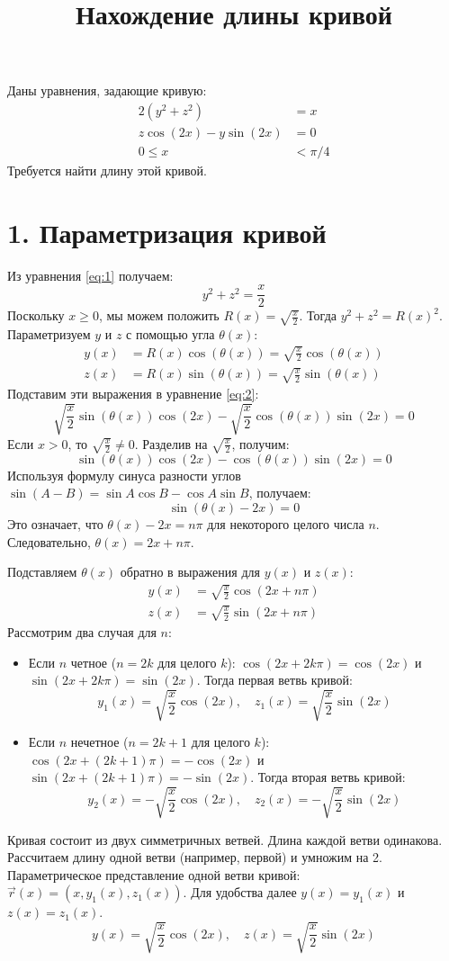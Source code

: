 \documentclass{article}
\title{Нахождение длины кривой}
\date{}
\begin{document}
\maketitle

Даны уравнения, задающие кривую:
\begin{align}
    2(y^2 + z^2) &= x \label{eq:1} \\
    z \cos(2x) - y \sin(2x) &= 0 \label{eq:2} \\
    0 \le x &< \pi/4 \label{eq:3}
\end{align}
Требуется найти длину этой кривой.

\section*{1. Параметризация кривой}
Из уравнения \eqref{eq:1} получаем:
\[ y^2 + z^2 = \frac{x}{2} \]
Поскольку $x \ge 0$, мы можем положить $R(x) = \sqrt{\frac{x}{2}}$. Тогда $y^2 + z^2 = R(x)^2$.
Параметризуем $y$ и $z$ с помощью угла $\theta(x)$:
\begin{align*}
    y(x) &= R(x) \cos(\theta(x)) = \sqrt{\frac{x}{2}} \cos(\theta(x)) \\
    z(x) &= R(x) \sin(\theta(x)) = \sqrt{\frac{x}{2}} \sin(\theta(x))
\end{align*}
Подставим эти выражения в уравнение \eqref{eq:2}:
\[ \sqrt{\frac{x}{2}} \sin(\theta(x)) \cos(2x) - \sqrt{\frac{x}{2}} \cos(\theta(x)) \sin(2x) = 0 \]
Если $x > 0$, то $\sqrt{\frac{x}{2}} \neq 0$. Разделив на $\sqrt{\frac{x}{2}}$, получим:
\[ \sin(\theta(x)) \cos(2x) - \cos(\theta(x)) \sin(2x) = 0 \]
Используя формулу синуса разности углов $\sin(A-B) = \sin A \cos B - \cos A \sin B$, получаем:
\[ \sin(\theta(x) - 2x) = 0 \]
Это означает, что $\theta(x) - 2x = n\pi$ для некоторого целого числа $n$.
Следовательно, $\theta(x) = 2x + n\pi$.

Подставляем $\theta(x)$ обратно в выражения для $y(x)$ и $z(x)$:
\begin{align*}
    y(x) &= \sqrt{\frac{x}{2}} \cos(2x + n\pi) \\
    z(x) &= \sqrt{\frac{x}{2}} \sin(2x + n\pi)
\end{align*}
Рассмотрим два случая для $n$:
\begin{itemize}
    \item Если $n$ четное ($n = 2k$ для целого $k$):
    $\cos(2x + 2k\pi) = \cos(2x)$ и $\sin(2x + 2k\pi) = \sin(2x)$.
    Тогда первая ветвь кривой:
    \[ y_1(x) = \sqrt{\frac{x}{2}} \cos(2x), \quad z_1(x) = \sqrt{\frac{x}{2}} \sin(2x) \]
    \item Если $n$ нечетное ($n = 2k+1$ для целого $k$):
    $\cos(2x + (2k+1)\pi) = -\cos(2x)$ и $\sin(2x + (2k+1)\pi) = -\sin(2x)$.
    Тогда вторая ветвь кривой:
    \[ y_2(x) = -\sqrt{\frac{x}{2}} \cos(2x), \quad z_2(x) = -\sqrt{\frac{x}{2}} \sin(2x) \]
\end{itemize}
Кривая состоит из двух симметричных ветвей. Длина каждой ветви одинакова. Рассчитаем длину одной ветви (например, первой) и умножим на 2.
Параметрическое представление одной ветви кривой: $\vec{r}(x) = (x, y_1(x), z_1(x))$. Для удобства далее $y(x) = y_1(x)$ и $z(x) = z_1(x)$.
\[ y(x) = \sqrt{\frac{x}{2}} \cos(2x), \quad z(x) = \sqrt{\frac{x}{2}} \sin(2x) \]
\end{document}
